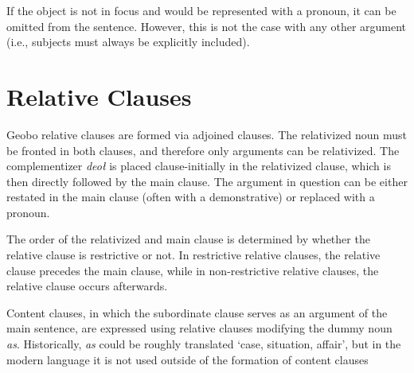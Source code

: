 \documentclass[a4paper,11pt,oneside,openany]{memoir}
\begin{document}
If the object is not in focus and would be represented with a pronoun, it can be omitted from the sentence. However, this is not the case with any other argument (i.e., subjects must always be explicitly included).


\section{Relative Clauses}

Geobo{\engma} relative clauses are formed via adjoined clauses. The relativized noun must be fronted in both clauses, and therefore only arguments can be relativized. The complementizer \textit{deo\l} is placed clause-initially in the relativized clause, which is then directly followed by the main clause. The argument in question can be either restated in the main clause (often with a demonstrative) or replaced with a pronoun.


The order of the relativized and main clause is determined by whether the relative clause is restrictive or not. In restrictive relative clauses, the relative clause precedes the main clause, while in non-restrictive relative clauses, the relative clause occurs afterwards.


Content clauses, in which the subordinate clause serves as an argument of the main sentence, are expressed using relative clauses modifying the dummy noun \textit{as}. Historically, \textit{as} could be roughly translated `case, situation, affair', but in the modern language it is not used outside of the formation of content clauses
\end{document}
